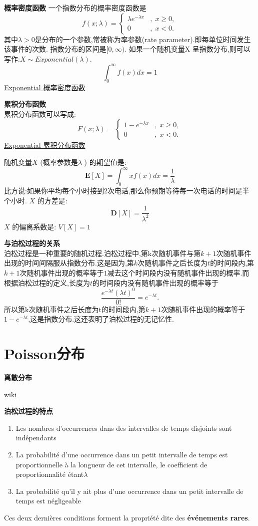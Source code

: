 \documentclass{article}
\begin{document}
\textbf{概率密度函数}
一个指数分布的概率密度函数是
$$f(x;\lambda )=\left\{{\begin{matrix}\lambda e^{{-\lambda x}}&,\;x\geq 0,\\0&,\;x<0.\end{matrix}}\right.$$
其中$\lambda  > 0$是分布的一个参数,常被称为率参数(rate parameter).即每单位时间发生该事件的次数.
指数分布的区间是$[0,\infty)$. 如果一个随机变量X 呈指数分布,则可以写作:$X \sim Exponential(\lambda )$.
$$
\int_0^{\infty} f(x)dx = 1
$$
\href{http://upload.wikimedia.org/wikipedia/commons/thumb/b/b1/Exponential\_distribution\_pdf.png/800px-Exponential\_distribution\_pdf.png}{Exponential 概率密度函数}
	
\textbf{累积分布函数}\\
累积分布函数可以写成:
$$F(x;\lambda )=\left\{{\begin{matrix}1-e^{{-\lambda x}}&,\;x\geq 0,\\0&,\;x<0.\end{matrix}}\right.$$
\href{http://upload.wikimedia.org/wikipedia/commons/thumb/b/b1/Exponential\_distribution\_pdf.png/800px-Exponential\_distribution\_pdf.png}{Exponential 累积分布函数}
	
随机变量$X$ (概率参数是$\lambda$ ) 的期望值是:
$$
{\mathbf  {E}}[X]=\int_0^{\infty} xf(x)dx = {\frac  {1}{\lambda }}
$$
比方说:如果你平均每个小时接到2次电话,那么你预期等待每一次电话的时间是半个小时.
$X$ 的方差是:
$${\mathbf  {D}}[X]={\frac{1}{\lambda ^{2}}}
$$
$X$ 的偏离系数是: $V[X] = 1$

\textbf{与泊松过程的关系}\\
泊松过程是一种重要的随机过程.泊松过程中,第k次随机事件与第$k+1$次随机事件出现的时间间隔服从指数分布.这是因为,第$k$次随机事件之后长度为$t$的时间段内,第$k+1$次随机事件出现的概率等于$1$减去这个时间段内没有随机事件出现的概率.而根据泊松过程的定义,长度为$t$的时间段内没有随机事件出现的概率等于
$$
{\frac  {e^{{-\lambda t}}(\lambda t)^{0}}{0!}}=e^{{-\lambda t}}.
$$
所以第k次随机事件之后长度为t的时间段内,第$k+1$次随机事件出现的概率等于$1-e^{{-\lambda t}}$,这是指数分布.这还表明了泊松过程的无记忆性.

\section{Poisson分布}
\label{sec.distribution.poisson}
\textbf{离散分布}

\href{http://en.wikipedia.org/wiki/Poisson\_distribution}{wiki}

\textbf{泊松过程的特点}
\begin{enumerate}
\item Les nombres d'occurrences dans des intervalles de temps disjoints sont ind\'ependants
\item La probabilit\'e d'une occurrence dans un petit intervalle de temps est proportionnelle \`a la longueur de cet intervalle, le coefficient de proportionnalit\'e \'etant$ \lambda$
\item La probabilit\'e qu'il y ait plus d'une occurrence dans un petit intervalle de temps est n\'egligeable
\end{enumerate}
Ces deux derni\`eres conditions forment la propri\'et\'e dite des \textbf{\'ev\'enements rares}.
\end{document}
